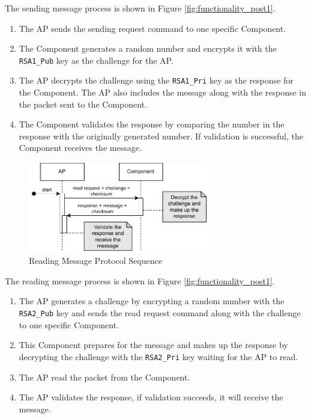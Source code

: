 \documentclass[11pt,oneside,onecolumn,letterpaper]{article}
\begin{document}
The sending message process is shown in Figure \ref{fig:functionality_post1}.
\begin{enumerate}
	\item The AP sends the sending request command to one specific Component.
	\item The Component generates a random number and encrypts it with the \texttt{RSA1\_Pub} key as the challenge for the AP.
	\item The AP decrypts the challenge using the \texttt{RSA1\_Pri} key as the response for the Component.
	The AP also includes the message along with the response in the packet sent to the Component.
	\item The Component validates the response by comparing the number in the response with the originally generated number.
	If validation is successful,
	the Component receives the message.
\end{enumerate}

\begin{figure}[h]
	\centering
	\includegraphics[width=0.7\textwidth]{pics/post2.pdf}
	\caption{Reading Message Protocol Sequence}
	\label{fig:functionality_post2}
\end{figure}

The reading message process is shown in Figure \ref{fig:functionality_post1}.
\begin{enumerate}
	\item The AP generates a challenge by encrypting a random number with the \texttt{RSA2\_Pub} key and sends the read request command along with the challenge to one specific Component.
	\item This Component prepares for the message and makes up the response by decrypting the challenge with the \texttt{RSA2\_Pri} key
	waiting for the AP to read.
	\item The AP read the packet from the Component.
	\item The AP validates the response,
	if validation succeeds,
	it will receive the message.
\end{enumerate}
\end{document}
